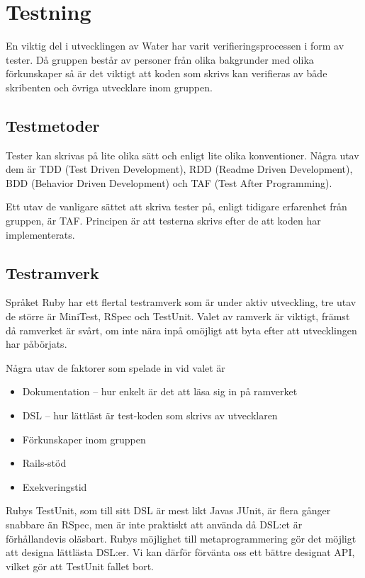 \section{Testning}
En viktig del i utvecklingen av Water har varit verifieringsprocessen i form av tester. Då gruppen består av personer från olika bakgrunder med olika förkunskaper så är det viktigt att koden som skrivs kan verifieras av både skribenten och övriga utvecklare inom gruppen.

\subsection{Testmetoder}
Tester kan skrivas på lite olika sätt och enligt lite olika konventioner. Några utav dem är TDD (Test Driven Development), RDD (Readme Driven Development), BDD (Behavior Driven Development) och TAF (Test After Programming).

Ett utav de vanligare sättet att skriva tester på, enligt tidigare erfarenhet från gruppen, är TAF. Principen är att testerna skrivs efter de att koden har implementerats.

\subsection{Testramverk}
Språket Ruby har ett flertal testramverk som är under aktiv utveckling, tre utav de större är MiniTest, RSpec och TestUnit. Valet av ramverk är viktigt, främst då ramverket är svårt, om inte nära inpå omöjligt att byta efter att utvecklingen har påbörjats.

Några utav de faktorer som spelade in vid valet är
\begin{itemize}
    \item Dokumentation – hur enkelt är det att läsa sig in på ramverket
    \item DSL – hur lättläst är test-koden som skrivs av utvecklaren
    \item Förkunskaper inom gruppen
    \item Rails-stöd
    \item Exekveringstid
\end{itemize}

Rubys TestUnit, som till sitt DSL är mest likt Javas JUnit, är flera gånger snabbare än RSpec, men är inte praktiskt att använda då DSL:et är förhållandevis oläsbart. Rubys möjlighet till metaprogrammering gör det möjligt att designa lättlästa DSL:er. Vi kan därför förvänta oss ett bättre designat API, vilket gör att TestUnit fallet bort.

